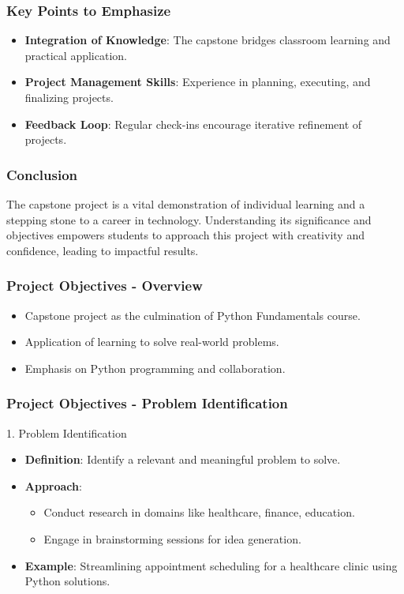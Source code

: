 \documentclass{beamer}
\begin{document}
\begin{frame}[fragile]
    \frametitle{Key Points to Emphasize}
    \begin{itemize}
        \item \textbf{Integration of Knowledge}: The capstone bridges classroom learning and practical application.
        \item \textbf{Project Management Skills}: Experience in planning, executing, and finalizing projects.
        \item \textbf{Feedback Loop}: Regular check-ins encourage iterative refinement of projects.
    \end{itemize}
\end{frame}

\begin{frame}[fragile]
    \frametitle{Conclusion}
    The capstone project is a vital demonstration of individual learning and a stepping stone to a career in technology. Understanding its significance and objectives empowers students to approach this project with creativity and confidence, leading to impactful results.
\end{frame}

\begin{frame}[fragile]
    \frametitle{Project Objectives - Overview}
    \begin{itemize}
        \item Capstone project as the culmination of Python Fundamentals course.
        \item Application of learning to solve real-world problems.
        \item Emphasis on Python programming and collaboration.
    \end{itemize}
\end{frame}

\begin{frame}[fragile]
    \frametitle{Project Objectives - Problem Identification}
    \begin{block}{1. Problem Identification}
        \begin{itemize}
            \item \textbf{Definition}: Identify a relevant and meaningful problem to solve.
            \item \textbf{Approach}:
                \begin{itemize}
                    \item Conduct research in domains like healthcare, finance, education.
                    \item Engage in brainstorming sessions for idea generation.
                \end{itemize}
            \item \textbf{Example}: Streamlining appointment scheduling for a healthcare clinic using Python solutions.
        \end{itemize}
    \end{block}
\end{frame}
\end{document}
